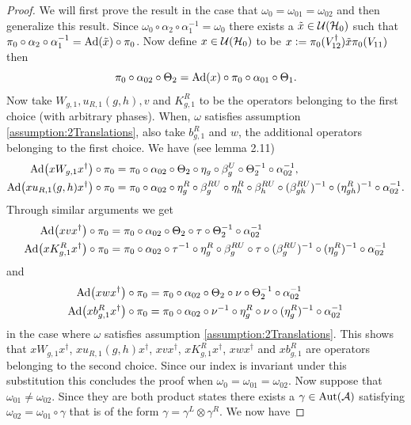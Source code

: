 \documentclass[11pt,a4paper,twoside]{article}
\numberwithin{equation}{section}
\begin{document}
	\begin{proof}
		We will first prove the result in the case that $\omega_0=\omega_{01}=\omega_{02}$ and then generalize this result. Since $\omega_0\circ\alpha_2\circ\alpha_1^{-1}=\omega_0$ there exists a $\tilde{x}\in\mathcal U(\mathcal H_0)$ such that $\pi_0\circ\alpha_2\circ\alpha_1^{-1}=\Ad{\tilde{x}}\circ\pi_0$. Now define $x\in\mathcal U(\mathcal H_0)$ to be $x\vcentcolon= \pi_0(V_{12}^\dagger)\tilde{x} \pi_0(V_{11})$ then
		\begin{equation}
			\pi_0\circ\alpha_{02}\circ\Theta_2=\Ad{x}\circ\pi_0\circ\alpha_{01}\circ\Theta_1.
		\end{equation}
		Now take $W_{g,1},u_{R,1}(g,h), v$ and $K^R_{g,1}$ to be the operators belonging to the first choice (with arbitrary phases). When, $\omega$ satisfies assumption \ref{assumption:2Translations}, also take $b^R_{g,1}$ and $w$, the additional operators belonging to the first choice.
		We have (see \cite{ogata2021h3gmathbb} lemma 2.11)
		\begin{align}
			\Ad{xW_{g,1}x^\dagger}\circ\pi_0&=\pi_0\circ \alpha_{02}\circ\Theta_2\circ\eta_g\circ\beta_g^U\circ\Theta_2^{-1}\circ\alpha_{02}^{-1},\\
			\nonumber
			\Ad{xu_{R,1}(g,h)x^\dagger}\circ\pi_0&=\pi_0\circ \alpha_{02}\circ\eta_g^R\circ\beta_g^{RU}\circ\eta_h^R\circ\beta_{h}^{RU}\circ(\beta_{gh}^{RU})^{-1}\circ(\eta_{gh}^R)^{-1}\circ\alpha_{02}^{-1}.
		\end{align}
		Through similar arguments we get
		\begin{align}
			\Ad{xvx^\dagger}\circ\pi_0&=\pi_0\circ\alpha_{02}\circ\Theta_2\circ\tau\circ\Theta_2^{-1}\circ\alpha_{02}^{-1}\\
			\nonumber
			\Ad{xK^R_{g,1}x^\dagger}\circ\pi_0&=\pi_0\circ \alpha_{02}\circ\tau^{-1}\circ\eta_g^R\circ\beta_g^{RU}\circ\tau\circ(\beta_g^{RU})^{-1}\circ(\eta^R_g)^{-1}\circ\alpha_{02}^{-1}
		\end{align}
		and
		\begin{align}
			\Ad{xwx^\dagger}\circ\pi_0&=\pi_0\circ\alpha_{02}\circ\Theta_2\circ\nu\circ\Theta_2^{-1}\circ\alpha_{02}^{-1}\\
			\nonumber
			\Ad{xb^R_{g,1}x^\dagger}\circ\pi_0&=\pi_0\circ \alpha_{02}\circ\nu^{-1}\circ\eta_g^R\circ\nu\circ(\eta_g^R)^{-1}\circ\alpha_{02}^{-1}
		\end{align}
		in the case where $\omega$ satisfies assumption \ref{assumption:2Translations}. This shows that $xW_{g,1}x^\dagger$, $xu_{R,1}(g,h)x^\dagger$, $xvx^\dagger$, $xK^R_{g,1}x^\dagger$, $xwx^\dagger$ and $x b^R_{g,1}$ are operators belonging to the second choice. Since our index is invariant under this substitution this concludes the proof when $\omega_0=\omega_{01}=\omega_{02}$. Now suppose that $\omega_{01}\neq\omega_{02}$. Since they are both product states there exists a $\gamma\in\Aut{\AA}$ satisfying $\omega_{02}=\omega_{01}\circ\gamma$ that is of the form $\gamma=\gamma^L\otimes\gamma^R$. We now have

\end{proof}
\end{document}
